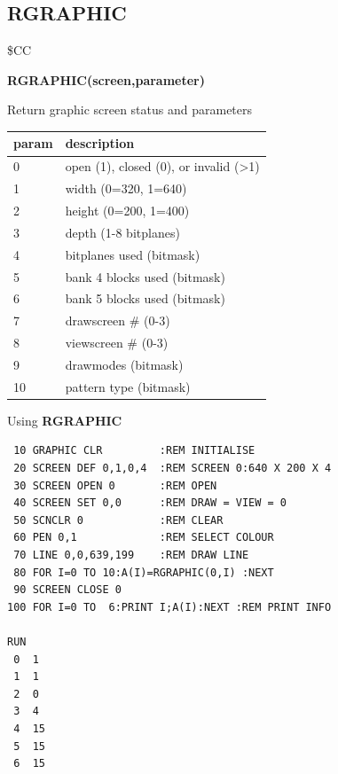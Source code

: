 \subsection{RGRAPHIC}
\begin{description}[leftmargin=2cm,style=nextline]
\item [Token:] \$CC
\item [Format:] {\bf RGRAPHIC(screen,parameter)}
\item [Usage:]  Return graphic screen status and parameters

\begin{center}
\ttfamily
{\setlength{\tabcolsep}{1mm}
\begin{tabular}{|l|l|}
\hline
 param  & description \\
\hline
 0 & open (1), closed (0), or invalid (>1)  \\
 1 & width  (0=320, 1=640)  \\
 2 & height (0=200, 1=400)  \\
 3 & depth (1-8 bitplanes)  \\
 4 & bitplanes used  (bitmask)  \\
 5 & bank 4 blocks used (bitmask)  \\
 6 & bank 5 blocks used (bitmask)  \\
 7 & drawscreen \# (0-3)  \\
 8 & viewscreen \# (0-3)  \\
 9 & drawmodes  (bitmask)  \\
10 & pattern type  (bitmask)  \\
\hline
\end{tabular}
}
\end{center}


\item [Example:] Using {\bf RGRAPHIC}

\begin{tcolorbox}[colback=black,coltext=white]
\verbatimfont{\codefont}
\begin{verbatim}
 10 GRAPHIC CLR         :REM INITIALISE
 20 SCREEN DEF 0,1,0,4  :REM SCREEN 0:640 X 200 X 4
 30 SCREEN OPEN 0       :REM OPEN
 40 SCREEN SET 0,0      :REM DRAW = VIEW = 0
 50 SCNCLR 0            :REM CLEAR
 60 PEN 0,1             :REM SELECT COLOUR
 70 LINE 0,0,639,199    :REM DRAW LINE
 80 FOR I=0 TO 10:A(I)=RGRAPHIC(0,I) :NEXT
 90 SCREEN CLOSE 0
100 FOR I=0 TO  6:PRINT I;A(I):NEXT :REM PRINT INFO

RUN
 0  1
 1  1
 2  0
 3  4
 4  15
 5  15
 6  15
\end{verbatim}
\end{tcolorbox}
\end{description}




